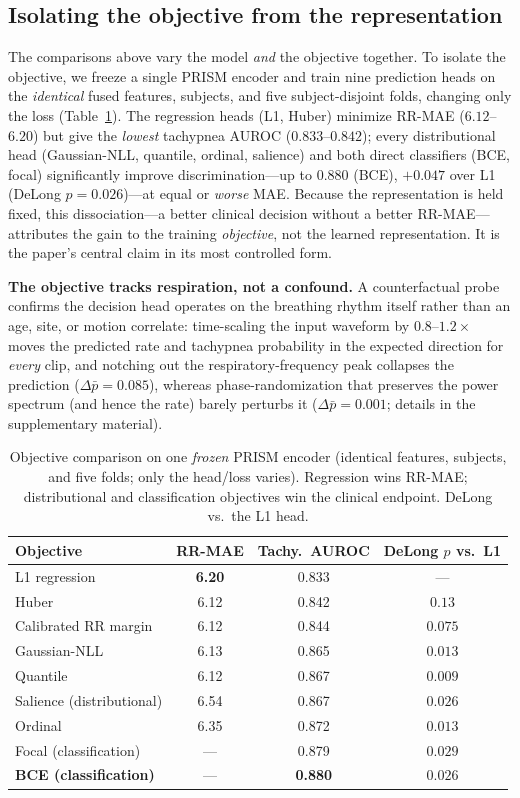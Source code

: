 \documentclass[journal]{IEEEtran}
\begin{document}
\subsection{Isolating the objective from the representation}\label{sec:objective}
The comparisons above vary the model \emph{and} the objective together. To isolate the objective, we freeze
a single PRISM encoder and train nine prediction heads on the \emph{identical} fused features, subjects, and
five subject-disjoint folds, changing only the loss (Table~\ref{tab:objective}). The regression heads
(L1, Huber) minimize RR-MAE ($6.12$--$6.20$) but give the \emph{lowest} tachypnea AUROC ($0.833$--$0.842$);
every distributional head (Gaussian-NLL, quantile, ordinal, salience) and both direct classifiers (BCE,
focal) significantly improve discrimination---up to $0.880$ (BCE), $+0.047$ over L1 (DeLong $p=0.026$)---at
equal or \emph{worse} MAE. Because the representation is held fixed, this dissociation---a better clinical
decision without a better RR-MAE---attributes the gain to the training \emph{objective}, not the learned
representation. It is the paper's central claim in its most controlled form.

\textbf{The objective tracks respiration, not a confound.} A counterfactual probe confirms the decision head
operates on the breathing rhythm itself rather than an age, site, or motion correlate: time-scaling the
input waveform by $0.8$--$1.2\times$ moves the predicted rate and tachypnea probability in the expected
direction for \emph{every} clip, and notching out the respiratory-frequency peak collapses the prediction
($\Delta\bar p{=}0.085$), whereas phase-randomization that preserves the power spectrum (and hence the rate)
barely perturbs it ($\Delta\bar p{=}0.001$; details in the supplementary material).

\begin{table}[!t]\caption{Objective comparison on one \emph{frozen} PRISM encoder (identical features,
subjects, and five folds; only the head/loss varies). Regression wins RR-MAE; distributional and
classification objectives win the clinical endpoint. DeLong vs.\ the L1 head.}\label{tab:objective}
\centering\small
\begin{tabular}{@{}lccc@{}}\toprule
Objective & RR-MAE & Tachy.\ AUROC & DeLong $p$ vs.\ L1\\\midrule
L1 regression & \textbf{6.20} & 0.833 & ---\\
Huber & 6.12 & 0.842 & $0.13$\\
Calibrated RR margin & 6.12 & 0.844 & $0.075$\\
Gaussian-NLL & 6.13 & 0.865 & $0.013$\\
Quantile & 6.12 & 0.867 & $0.009$\\
Salience (distributional) & 6.54 & 0.867 & $0.026$\\
Ordinal & 6.35 & 0.872 & $0.013$\\
Focal (classification) & --- & 0.879 & $0.029$\\
\textbf{BCE (classification)} & --- & \textbf{0.880} & $\mathbf{0.026}$\\\bottomrule
\end{tabular}\end{table}
\end{document}
